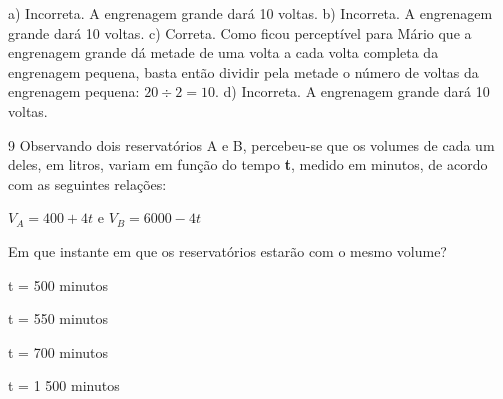 \begin{escolha}
\begin{boxmedio}
\begin{boxmedio}
{\begin{boxpeq}
\begin{boxpeq}
{\begin{boxpeq}
\begin{boxmedio}
\begin{boxmedio}
\begin{boxpeq}
\begin{boxmedio}
\begin{boxpeq}
\begin{boxpeq}
\begin{boxpeq}
\begin{boxpeq}
\begin{boxmedio}
{\begin{boxmedio}
\begin{boxmedio}
\begin{boxpeq}
\begin{boxmedio}
\begin{boxpeq}
\begin{boxpeq}
\begin{boxpeq}
\begin{escolha}
{\begin{boxmedio}
\begin{boxpeq}
\begin{boxpeq}
\begin{boxpeq}
\begin{boxpeq}
\begin{boxpeq}
\begin{boxmedio}
\begin{boxpeq}
\begin{boxpeq}
\begin{boxpeq}
{\begin{boxpeq}
\begin{boxmedio}
\begin{boxpeq}
\begin{boxpeq}
\begin{boxpeq}
{\begin{boxpeq}
\begin{boxmedio}
{\begin{boxpeq}
\begin{boxpeq}
\begin{boxmedio}
\begin{boxmedio}
\begin{boxpeq}
\begin{boxpeq}
{\begin{boxpeq}
\begin{boxpeq}
\begin{boxpeq}
\begin{boxpeq}
\begin{boxpeq}
\begin{escolha}
\begin{escolha}
{\begin{boxmedio}
\begin{boxpeq}
\begin{q°}
\begin{boxmedio}
\begin{boxpeq}
\begin{boxpeq}
\begin{boxmedio}
\begin{boxmedio}
\begin{boxmedio}
\begin{boxmedio}
{{a) Incorreta. A engrenagem grande dará 10 voltas.
b) Incorreta. A engrenagem grande dará 10 voltas.
c) Correta. Como ficou perceptível para Mário que a engrenagem grande dá metade de uma
volta a cada volta completa da engrenagem pequena, basta então dividir pela
metade o número de voltas da engrenagem pequena: $20 \div 2 = 10$.
d) Incorreta. A engrenagem grande dará 10 voltas.}

\num{9} Observando dois reservatórios A e B, percebeu-se que os volumes de 
cada um deles, em litros, variam em função do tempo \textbf{t}, medido em
minutos, de acordo com as seguintes relações:

$V_A = 400 + 4t$ e $V_B = 6000 - 4t$

Em que instante em que os reservatórios estarão com o mesmo volume?

\begin{escolha}

  \item t = 500 minutos

  \item t = 550 minutos

  \item t = 700 minutos

  \item t = 1 500 minutos

\end{escolha}

}
\end{boxmedio}
\end{boxmedio}
\end{boxmedio}
\end{boxmedio}
\end{boxpeq}
\end{boxpeq}
\end{boxmedio}
\end{q°}
\end{boxpeq}
\end{boxmedio}}
\end{escolha}
\end{escolha}
\end{boxpeq}
\end{boxpeq}
\end{boxpeq}
\end{boxpeq}
\end{boxpeq}}
\end{boxpeq}
\end{boxpeq}
\end{boxmedio}
\end{boxmedio}
\end{boxpeq}
\end{boxpeq}}
\end{boxmedio}
\end{boxpeq}}
\end{boxpeq}
\end{boxpeq}
\end{boxpeq}
\end{boxmedio}
\end{boxpeq}}
\end{boxpeq}
\end{boxpeq}
\end{boxpeq}
\end{boxmedio}
\end{boxpeq}
\end{boxpeq}
\end{boxpeq}
\end{boxpeq}
\end{boxpeq}
\end{boxmedio}}
\end{escolha}
\end{boxpeq}
\end{boxpeq}
\end{boxpeq}
\end{boxmedio}
\end{boxpeq}
\end{boxmedio}
\end{boxmedio}}
\end{boxmedio}
\end{boxpeq}
\end{boxpeq}
\end{boxpeq}
\end{boxpeq}
\end{boxmedio}
\end{boxpeq}
\end{boxmedio}
\end{boxmedio}
\end{boxpeq}}
\end{boxpeq}
\end{boxpeq}}
\end{boxmedio}
\end{boxmedio}
\end{escolha}
